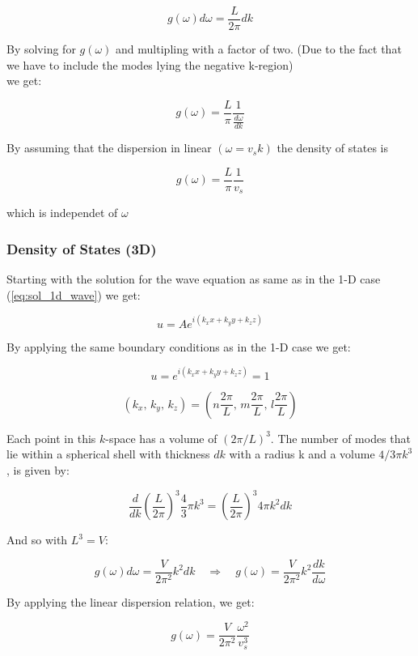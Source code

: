 $$g(\omega) d\omega =\dfrac{L}{2\pi} dk$$

By solving for $g(\omega)$ and multipling with a factor of two.
(Due to the fact that we have to include the modes lying the negative k-region)\\
we get:

\begin{equation}
    g(\omega) = \frac{L}{\pi} \frac{1}{\frac{d\omega}{d k}}
\end{equation}

By assuming that the dispersion in linear $(\omega = v_sk)$ 
the density of states is

\begin{equation}
    g(\omega) = \frac{L}{\pi} \frac{1}{v_s}
\end{equation}

which is independet of $\omega$

\subsubsection*{Density of States (3D)}

Starting with the solution for the wave equation as same as in the 1-D case
(\autoref{eq:sol_1d_wave}) we get:

\begin{equation}
    u = Ae^{i(k_x x + k_y y + k_z z)}
\end{equation}

By applying the same boundary conditions as in the 1-D case we get:

$$u = e^{i(k_x x + k_y y + k_z z)} = 1$$

$$(k_x, \, k_y,\, k_z) = (n \frac{2\pi}{L}, \, m \frac{2\pi}{L}, \, l \frac{2\pi}{L})$$

Each point in this $k$-space has a volume of $(2\pi/L)^3$. The number of
modes that lie within a spherical shell with thickness $dk$ with a radius k 
and a volume $4/3\pi k^3$, is given by:

$$\frac{d}{dk}{(\frac{L}{2\pi})}^3\frac{4}{3}\pi k^3 = {(\frac{L}{2\pi})}^3 4\pi k^2 dk$$

And so with $L^3 = V$:

$$ g(\omega) d \omega =  \frac{V}{2\pi^2} k^2 dk \quad \Rightarrow \quad g(\omega) = \frac{V}{2\pi^2} k^2 \frac{dk}{d \omega} $$

By applying the linear dispersion relation, we get:

\begin{equation}
    g(\omega) = \frac{V}{2\pi^2} \frac{\omega^2}{v_s^3}
    \label{eq:g_ome_3d_1}
\end{equation}


